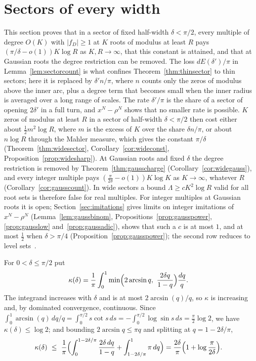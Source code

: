 \documentclass[11pt]{article}
\begin{document}
\section{Sectors of every width}\label{sec:widesectors}

This section proves that in a sector of fixed half-width $\delta<\pi/2$,
every multiple of degree $O(K)$ with $|f_D|\ge1$ at $K$ roots of modulus at
least $R$ pays $(\pi/\delta-o(1))K\log R$ as $K,R\to\infty$, that this
constant is attained, and that at Gaussian roots the degree restriction can
be removed.  The loss $dE(\delta')/\pi$ in Lemma~\ref{lem:sectorcount} is what confines
Theorem~\ref{thm:thinsector} to thin sectors; here it is replaced by
$\delta'n/\pi$, where $n$ counts only the zeros of modulus above the inner
arc, plus a degree term that becomes small when the inner radius is averaged
over a long range of scales.  The rate $\delta'/\pi$ is the share of a
sector of opening $2\delta'$ in a full turn, and $x^N-\rho^N$ shows that no
smaller rate is possible.  $K$ zeros of modulus at least $R$ in a sector of
half-width $\delta<\pi/2$ then cost either about $\frac12m^2\log R$, where
$m$ is the excess of $K$ over the share $\delta n/\pi$, or about $n\log R$
through the Mahler measure, which gives the constant $\pi/\delta$
(Theorem~\ref{thm:widesector}, Corollary~\ref{cor:wideconst},
Proposition~\ref{prop:widesharp}).  At Gaussian roots and fixed $\delta$ the
degree restriction is removed by Theorem~\ref{thm:gausscharge}
(Corollary~\ref{cor:widegauss}), and every integer multiple pays
$(\frac\pi{2\delta}-o(1))K\log K$ as $K\to\infty$, whatever $R$
(Corollary~\ref{cor:gausscount}).
In wide sectors a bound $\Lambda\ge cK^2\log R$ valid for all root sets is
therefore false for real multiples.  For integer
multiples at Gaussian roots it is open; Section~\ref{sec:imitations} gives
limits on integer imitations of $x^N-\rho^N$ (Lemma~\ref{lem:gaussbinom},
Propositions~\ref{prop:gausspower}, \ref{prop:gausslow}
and~\ref{prop:gaussadic}), shows that such a
$c$ is at most $1$, and at most $\frac12$ when $\delta>\pi/4$
(Proposition~\ref{prop:gausspower}); the second row reduces to level
sets~\cite{coefficient-mass-levelsets}.

For $0<\delta\le\pi/2$ put
\[
  \kappa(\delta)=\frac1\pi\int_0^1\min\Bigl(2\arcsin q,\ \frac{2\delta q}{1-q}\Bigr)\frac{dq}q .
\]
The integrand increases with $\delta$ and is at most $2\arcsin(q)/q$, so
$\kappa$ is increasing and, by dominated convergence, continuous.  Since
$\int_0^1\arcsin(q)\,dq/q=\int_0^{\pi/2}s\cot s\,ds=-\int_0^{\pi/2}\log\sin s\,ds
=\frac\pi2\log2$, we have $\kappa(\delta)\le\log2$; and bounding
$2\arcsin q\le\pi q$ and splitting at $q=1-2\delta/\pi$,
\[
  \kappa(\delta)\ \le\ \frac1\pi\Bigl(\int_0^{1-2\delta/\pi}\frac{2\delta\,dq}{1-q}
  +\int_{1-2\delta/\pi}^1\pi\,dq\Bigr)
  =\frac{2\delta}\pi\Bigl(1+\log\frac\pi{2\delta}\Bigr).
\]
\end{document}

